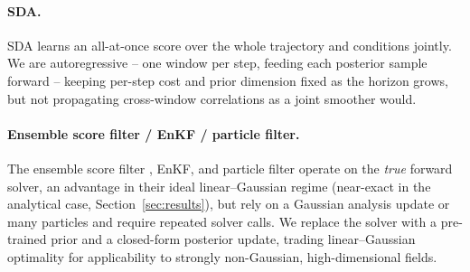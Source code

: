 \paragraph{SDA.}
SDA \cite{rozet_score-based_2023} learns an all-at-once score over the whole trajectory and conditions jointly. We are autoregressive -- one window per step, feeding each posterior sample forward -- keeping per-step cost and prior dimension fixed as the horizon grows, but not propagating cross-window correlations as a joint smoother would.

\paragraph{Ensemble score filter / EnKF / particle filter.}
The ensemble score filter \cite{bao_ensemble_2024}, EnKF, and particle filter operate on the \emph{true} forward solver, an advantage in their ideal linear--Gaussian regime (near-exact in the analytical case, Section~\ref{sec:results}), but rely on a Gaussian analysis update or many particles and require repeated solver calls. We replace the solver with a pre-trained prior and a closed-form posterior update, trading linear--Gaussian optimality for applicability to strongly non-Gaussian, high-dimensional fields.
